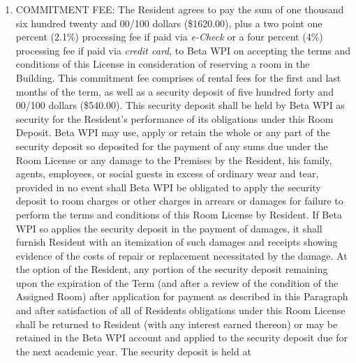\documentclass[legalpaper, 12pt]{article}
\begin{document}
\begin{enumerate}
\begin{enumerate}[label=\Alph*.]
        \end{enumerate} 

        \item\label{itm:commitmentfee} COMMITMENT FEE\@: The Resident agrees to
                pay the sum of one thousand six hundred twenty and 00/100
                dollars (\$1620.00), plus a two point one percent (2.1\%)
                processing fee if paid via \textit{e-Check} or a four percent
                (4\%) processing fee if paid via \textit{credit card}, to Beta
                WPI on accepting the terms and conditions of this License in
                consideration of reserving a room in the Building.  This
                commitment fee comprises of rental fees for the first and last
                months of the term, as well as a security deposit of five
                hundred forty and 00/100 dollars (\$540.00). This security
                deposit shall be held by Beta WPI as security for the
                Resident’s performance of its obligations under this Room
                Deposit.  Beta WPI may use, apply or retain the whole or any
                part of the security deposit so deposited for the payment of
                any sums due under the Room License or any damage to the
                Premises by the Resident, his family, agents, employees, or
                social guests in excess of ordinary wear and tear, provided in
                no event shall Beta WPI be obligated to apply the security
                deposit to room charges or other charges in arrears or damages
                for failure to perform the terms and conditions of this Room
                License by Resident. If Beta WPI so applies the security
                deposit in the payment of damages, it shall furnish Resident
                with an itemization of such damages and receipts showing
                evidence of the costs of repair or replacement necessitated by
                the damage.  At the option of the Resident, any portion of the
                security deposit remaining upon the expiration of the Term (and
                after a review of the condition of the Assigned Room) after
                application for payment as described in this Paragraph and
                after satisfaction of all of Residents obligations under this
                Room License shall be returned to Resident (with any interest
                earned thereon) or may be retained in the Beta WPI account and
                applied to the security deposit due for the next academic year.
                The security deposit is held at\\ 


\end{enumerate}
\end{document}
